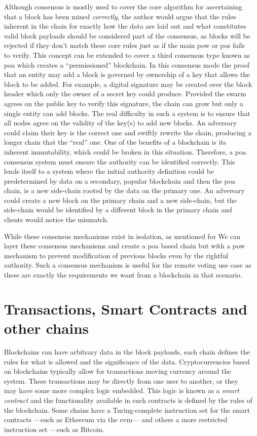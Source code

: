 Although consensus is mostly used to cover the core algorithm for ascertaining that a block has been mined \emph{correctly}, the author would argue that the rules inherent in the chain for exactly how the data are laid out and what constitutes valid block payloads should be considered part of the consensus, as blocks will be rejected if they don't match these core rules just as if the main \gls{pow} or \gls{pos} fails to verify. This concept can be extended to cover a third consensus type known as \gls{poa} which creates a ``permissioned'' blockchain. In this consensus mode the proof that an entity may add a block is governed by ownership of a key that allows the block to be added. For example, a digital signature may be created over the block header which only the owner of a secret key could produce. Provided the swarm agrees on the public key to verify this signature, the chain can grow but only a single entity can add blocks. The real difficulty in such a system is to ensure that all nodes agree on the validity of the key(s) to add new blocks. An adversary could claim their key is the correct one and swiftly rewrite the chain, producing a longer chain that the ``real'' one. One of the benefits of a blockchain is its inherent immutability, which could be broken in this situation.  Therefore, a \gls{poa} consensus system must ensure the authority can be identified correctly. This lends itself to a system where the initial authority definition could be predetermined by data on a secondary, popular blockchain and then the \gls{poa} chain, is a new side-chain rooted by the data on the primary one. An adversary could create a new block on the primary chain and a new side-chain, but the side-chain would be identified by a different block in the primary chain and clients would notice the mismatch.

While these consensus mechanisms exist in isolation, as mentioned for We can layer these consensus mechanisms and create a \gls{poa} based chain but with a \gls{pow} mechanism to prevent modification of previous blocks even by the rightful authority. Such a consensus mechanism is useful for the remote voting use case as these are exactly the requirements we want from a blockchain in that scenario.

\section{Transactions, Smart Contracts and other chains}
\label{ch:blockchain:types}

Blockchains can have arbitrary data in the block payloads, each chain defines the rules for what is allowed and the significance of the data. Cryptocurrencies based on blockchains typically allow for transactions moving currency around the system. These transactions may be directly from one user to another, or they may have some more complex logic embedded. This logic is known as a \emph{smart contract} and the functionality available in such contracts is defined by the rules of the blockchain. Some chains have a Turing-complete instruction set for the smart contracts ---such as Ethereum via the \gls{evm}--- and others a more restricted instruction set ---such as Bitcoin.

